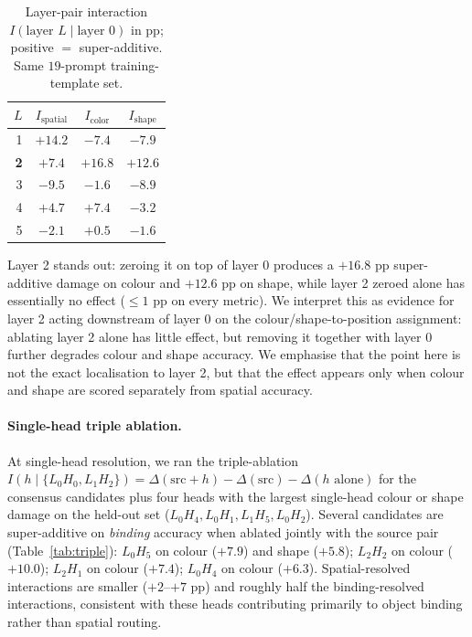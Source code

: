\documentclass{article}
\begin{document}
\begin{table}[t]
\centering
\small
\caption{Layer-pair interaction $I(\text{layer }L \mid \text{layer }0)$ in pp; positive $=$ super-additive. Same $19$-prompt training-template set.}
\label{tab:layer_pair}
\begin{tabular}{rccc}
\toprule
$L$ & $I_\text{spatial}$ & $I_\text{color}$ & $I_\text{shape}$ \\
\midrule
1 & $+14.2$ & $-7.4$ & $-7.9$ \\
\textbf{2} & $\mathbf{+7.4}$ & $\mathbf{+16.8}$ & $\mathbf{+12.6}$ \\
3 & $-9.5$ & $-1.6$ & $-8.9$ \\
4 & $+4.7$ & $+7.4$ & $-3.2$ \\
5 & $-2.1$ & $+0.5$ & $-1.6$ \\
\bottomrule
\end{tabular}
\end{table}

Layer 2 stands out: zeroing it on top of layer 0 produces a $+16.8$ pp super-additive damage on colour and $+12.6$ pp on shape, while layer 2 zeroed alone has essentially no effect ($\leq 1$ pp on every metric). We interpret this as evidence for layer 2 acting downstream of layer 0 on the colour/shape-to-position assignment: ablating layer 2 alone has little effect, but removing it together with layer 0 further degrades colour and shape accuracy. We emphasise that the point here is not the exact localisation to layer 2, but that the effect appears only when colour and shape are scored separately from spatial accuracy.

\paragraph{Single-head triple ablation.}
At single-head resolution, we ran the triple-ablation $I(h \mid \{L_0H_0, L_1H_2\}) = \Delta(\text{src}+h) - \Delta(\text{src}) - \Delta(h\text{ alone})$ for the consensus candidates plus four heads with the largest single-head colour or shape damage on the held-out set ($L_0H_4, L_0H_1, L_1H_5, L_0H_2$). Several candidates are super-additive on \emph{binding} accuracy when ablated jointly with the source pair (Table~\ref{tab:triple}): $L_0H_5$ on colour ($+7.9$) and shape ($+5.8$); $L_2H_2$ on colour ($+10.0$); $L_2H_1$ on colour ($+7.4$); $L_0H_4$ on colour ($+6.3$). Spatial-resolved interactions are smaller ($+2$--$+7$ pp) and roughly half the binding-resolved interactions, consistent with these heads contributing primarily to object binding rather than spatial routing.
\end{document}
